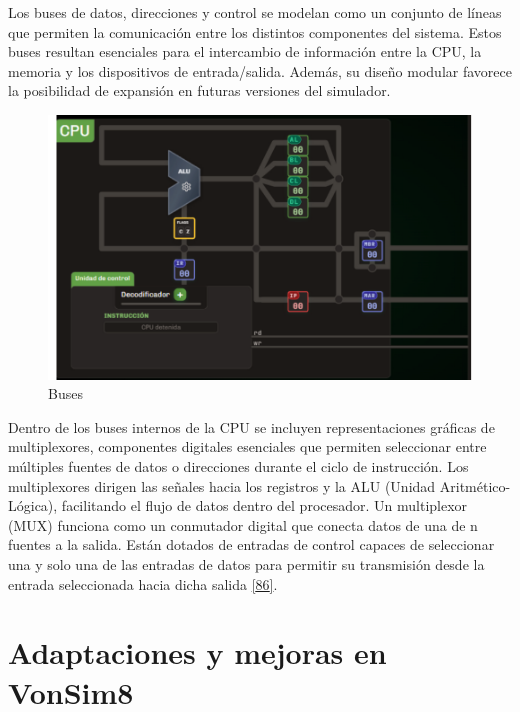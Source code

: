 \documentclass[12pt,oneside]{templates/unerthesis}
\begin{document}
Los buses de datos, direcciones y control se modelan como un conjunto de líneas que permiten la comunicación entre los distintos componentes del sistema. Estos buses resultan esenciales para el intercambio de información entre la CPU, la memoria y los dispositivos de entrada/salida. Además, su diseño modular favorece la posibilidad de expansión en futuras versiones del simulador.

\begin{figure}

{\centering \includegraphics[width=1\linewidth]{images/buses} 

}

\caption{Buses}\label{fig:buses}
\end{figure}

Dentro de los buses internos de la CPU se incluyen representaciones gráficas de multiplexores, componentes digitales esenciales que permiten seleccionar entre múltiples fuentes de datos o direcciones durante el ciclo de instrucción. Los multiplexores dirigen las señales hacia los registros y la ALU (Unidad Aritmético-Lógica), facilitando el flujo de datos dentro del procesador. Un multiplexor (MUX) funciona como un conmutador digital que conecta datos de una de n fuentes a la salida. Están dotados de entradas de control capaces de seleccionar una y solo una de las entradas de datos para permitir su transmisión desde la entrada seleccionada hacia dicha salida \protect\hyperlink{ref-mano2017digital}{{[}86{]}}.

\hypertarget{adaptaciones-y-mejoras-en-vonsim8}{%
\section{Adaptaciones y mejoras en VonSim8}\label{adaptaciones-y-mejoras-en-vonsim8}}
\end{document}

